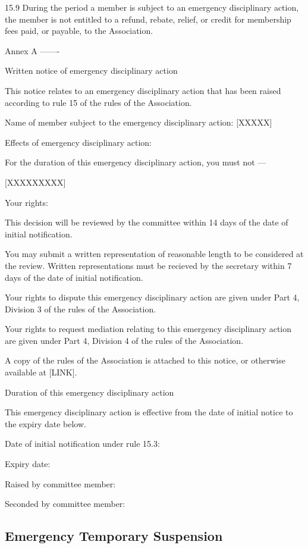 \documentclass[../constitution.tex]{subfiles}
\begin{document}
15.9 During the period a member is subject to an emergency disciplinary action, the member is not entitled to a refund, rebate, relief, or credit for membership fees paid, or payable, to the Association.




Annex A
-------

Written notice of emergency disciplinary action

This notice relates to an emergency disciplinary action that has been raised according to rule 15 of the rules of the Association.

Name of member subject to the emergency disciplinary action: [XXXXX]

Effects of emergency disciplinary action:

For the duration of this emergency disciplinary action, you must not ---

[XXXXXXXXX]

Your rights:

This decision will be reviewed by the committee within 14 days of the date of initial notification.

You may submit a written representation of reasonable length to be considered at the review. Written representations must be recieved by the secretary within 7 days of the date of initial notification.

Your rights to dispute this emergency disciplinary action are given under Part 4, Division 3 of the rules of the Association.

Your rights to request mediation relating to this emergency disciplinary action are given under Part 4, Division 4 of the rules of the Association.

A copy of the rules of the Association is attached to this notice, or otherwise available at [LINK].


Duration of this emergency disciplinary action

This emergency disciplinary action is effective from the date of initial notice to the expiry date below.

Date of initial notification under rule 15.3:

Expiry date:

Raised by committee member:

Seconded by committee member:



\hypertarget{emergency-temporary-suspension}{%
\subsection{Emergency Temporary Suspension}\label{emergency-temporary-suspension}}
\end{document}
